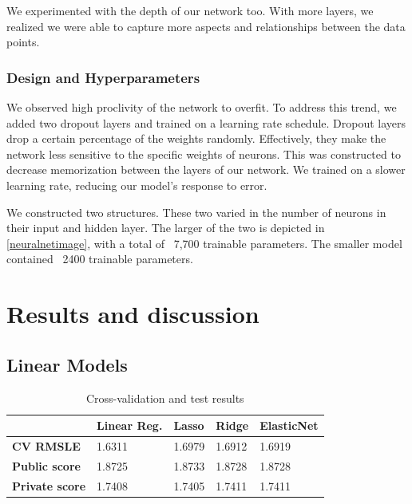 \documentclass[sigplan,screen]{acmart}
\begin{document}
We experimented with the depth of our network too. With more layers, we realized we were able to capture more aspects and relationships between the data points.
\subsubsection{Design and Hyperparameters}
We observed high proclivity of the network to overfit. To address this trend, we added two dropout layers and trained on a learning rate schedule. Dropout layers drop a certain percentage of the weights randomly. Effectively, they make the network less sensitive to the specific weights of neurons. This was constructed to decrease memorization between the layers of our network. We trained on a slower learning rate, reducing our model's response to error.

We constructed two structures. These two varied in the number of neurons in their input and hidden layer. The larger of the two is depicted in \ref{neuralnetimage}, with a total of ~7,700 trainable parameters. The smaller model contained ~2400 trainable parameters.

\section{Results and discussion}

\subsection{Linear Models}
\vspace{-3mm}
\begin{table}[H]
\begin{tabular}{|l|l|l|l|l|}
\hline
              & \textbf{Linear Reg.} & \textbf{Lasso}  & \textbf{Ridge}  & \textbf{ElasticNet} \\ \hline
\textbf{CV RMSLE}      & 1.6311      & 1.6979 & 1.6912 & 1.6919     \\ \hline
\textbf{Public score}  & 1.8725      & 1.8733 & 1.8728 & 1.8728     \\ \hline
\textbf{Private score} & 1.7408      & 1.7405 & 1.7411 & 1.7411     \\ \hline
\end{tabular}
\caption{Cross-validation and test results}
\label{tab:linear-models}
 \vspace{-5.8mm}
\end{table}
\vspace*{-\baselineskip}
\end{document}
